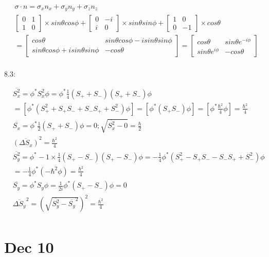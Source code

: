 \documentclass{article}
\begin{document}
\begin{align*}
&\sigma\cdot n=\sigma_xn_x+\sigma_yn_y+\sigma_zn_z \\
&\begin{bmatrix}0&1\\1&0\end{bmatrix}\times sin\theta cos\phi+\begin{bmatrix}0&-i\\i&0\end{bmatrix}\times sin\theta sin\phi+\begin{bmatrix}1&0\\0&-1\end{bmatrix}\times cos\theta\\
&=\begin{bmatrix}cos\theta&sin\theta cos\phi-isin\theta sin\phi\\sin\theta cos\phi+isin\theta sin\phi&-cos\theta\end{bmatrix}=\begin{bmatrix}cos\theta&sin\theta e^{-i\phi}\\sin\theta e^{i\phi}&-cos\theta\end{bmatrix}\\
\end{align*}

8.3:

\begin{align*}
&\overline{S_x^2}=\phi^*S_x^2\phi=\phi^*\frac14(S_++S_-)(S_++S_-)\phi \\
&=[\phi^*(S_+^2+S_+S_-+S_-S_++S_-^2)\phi]=[\phi^*(S_+S_-)\phi]=[\phi^*\frac{\hbar^2}4\phi]=\frac{\hbar^2}{4} \\
&\overline{S_x}=\phi^*\frac12(S_++S_-)\phi=0;\sqrt{\overline{S_x^2}-0}=\frac{\hbar}2 \\
&\overline{(\Delta S_x)}^2=\frac{\hbar^2}4 \\
&\overline{S_y^2}=\phi^*-1\times\frac14(S_+-S_-)(S_+-S_-)\phi=-\frac14\phi^*(S_+^2-S_+S_--S_-S_++S_-^2)\phi\\&=-\frac14\phi^*(-\hbar^2\phi)=\frac{\hbar^2}4 \\
&\overline{S_y}=\phi^*S_y\phi=\frac1{2i}\phi^*(S_+-S_-)\phi=0 \\
&\overline{\Delta S_y}^2=(\sqrt{\overline{S_y^2}-\overline{S_y}^2})^2=\frac{\hbar^2}4 \\
\end{align*}

\newpage
\section{Dec 10}
\end{document}
